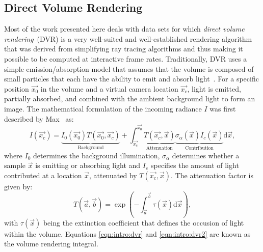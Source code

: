 \subsection{Direct Volume Rendering} \label{cha:intro:vp:dvr}
Most of the work presented here deals with  data sets for which \emph{direct volume rendering}~(DVR) is a very well-suited and well-established rendering algorithm that was derived from simplifying ray tracing algorithms and thus making it possible to be computed at interactive frame rates.  Traditionally, DVR uses a simple emission/absorption model that assumes that the volume is composed of small particles that each have the ability to emit and absorb light~\cite{levoy1988display, drebin1988volume, sabella1988rendering}.  For a specific position $\vec{x_0}$ in the volume and a virtual camera location $\vec{x_c}$, light is emitted, partially absorbed, and combined with the ambient background light to form an image.  The mathematical formulation of the incoming radiance $I$ was first described by Max~\cite{max1995optical, max2010local} as:
\begin{equation}
I(\vec{x_c}) = \underbrace{I_0\left( \vec{x_0} \right) T\left( \vec{x_0}, \vec{x_c} \right)}_{\textrm{Background}} + \int_\vec{x_c}^\vec{x_0}  \underbrace{T(\vec{x_c}, \vec{x})}_{\textrm{Attenuation}} \underbrace{\sigma_\alpha(\vec{x}) I_c(\vec{x})}_{\textrm{Contribution}} \textrm{d} \vec{x},
\label{eqn:intro:dvr}
\end{equation}
\noindent where $I_0$ determines the background illumination, $\sigma_\alpha$ determines whether a sample $\vec{x}$ is emitting or absorbing light and $I_e$ specifies the amount of light contributed at a location $\vec{x}$, attenuated by $T(\vec{x_c}, \vec{x})$.  The attenuation factor is given by:
\begin{equation}
T(\vec{a}, \vec{b}) = \exp \left( -\int_\vec{a}^\vec{b} \tau(\vec{x}) \textrm{d} \vec{x} \right),
\label{eqn:intro:dvr2}
\end{equation}
\noindent with $\tau(\vec{x})$ being the extinction coefficient that defines the occusion of light within the volume.  Equations \ref{eqn:intro:dvr} and \ref{eqn:intro:dvr2} are known as the volume rendering integral.

